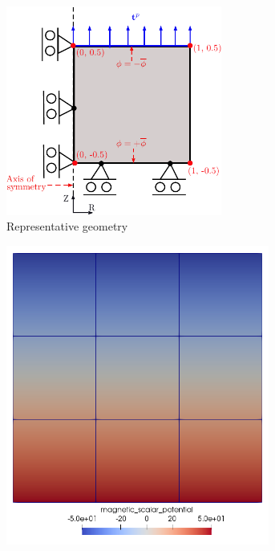 \documentclass[11pt,a4paper,final]{article}
\begin{document}
\begin{figure}[h]
\centering
\begin{subfigure}{0.4\textwidth}
\centering
\includegraphics[width=0.78\textwidth]{coupled_unit_test_geom.pdf}
\caption{Representative geometry}
\label{fig:3.8.1}
\end{subfigure}
\begin{subfigure}{0.28\textwidth}
\centering
\includegraphics[width=0.95\textwidth]{coup_unit_test_mag_pot.png}

\end{subfigure}
\end{figure}
\end{document}
